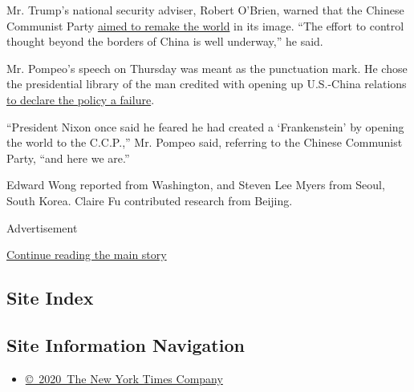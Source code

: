 Mr. Trump's national security adviser, Robert O'Brien, warned that the
Chinese Communist Party
\href{https://www.whitehouse.gov/briefings-statements/chinese-communist-partys-ideology-global-ambitions/}{aimed
to remake the world} in its image. ``The effort to control thought
beyond the borders of China is well underway,'' he said.

Mr. Pompeo's speech on Thursday was meant as the punctuation mark. He
chose the presidential library of the man credited with opening up
U.S.-China relations
\href{https://www.state.gov/communist-china-and-the-free-worlds-future/}{to
declare the policy a failure}.

``President Nixon once said he feared he had created a `Frankenstein' by
opening the world to the C.C.P.,'' Mr. Pompeo said, referring to the
Chinese Communist Party, ``and here we are.''

Edward Wong reported from Washington, and Steven Lee Myers from Seoul,
South Korea. Claire Fu contributed research from Beijing.

Advertisement

\protect\hyperlink{after-bottom}{Continue reading the main story}

\hypertarget{site-index}{%
\subsection{Site Index}\label{site-index}}

\hypertarget{site-information-navigation}{%
\subsection{Site Information
Navigation}\label{site-information-navigation}}

\begin{itemize}
\tightlist
\item
  \href{https://help.nytimes3xbfgragh.onion/hc/en-us/articles/115014792127-Copyright-notice}{©~2020~The
  New York Times Company}
\end{itemize}


